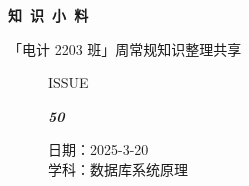 \documentclass[UTF8]{ctexart}
\newcommand\Black[1]{\textcolor[gray]{0.3}{#1}}
\newcommand\Brown[1]{\textcolor[HTML]{998A4E}{#1}}
\newcommand\IssueNumber{50}
\newcommand\Date{2025-3-20}
\newcommand\Subject{数据库系统原理}
\begin{document}
\BgThispage
\begin{center}
\phantom{...}

{\Large\textcolor{brown!40!white}{}}

\vspace{-2em}

{\Huge\bfseries\TitleFont \Black{知\ 识\ 小\ 料}}


\vspace{-0.1cm}
{\footnotesize \Brown{「电计 2203 班」周常规知识整理共享}}
\end{center}

\vspace{-0.5cm}


\begin{figure}[H]
\hspace{1cm}
\begin{minipage}[t]{0.3\textwidth}
\centering
    \Brown{\Genshin ISSUE}

    \vspace{-0.6cm}
    \Huge \Issue\slshape\bfseries\Black{\IssueNumber}
\end{minipage}
\hfill
\begin{minipage}[t]{0.35\textwidth}
\centering
    \Brown{日期：\Date} \\
\vspace{-0.1cm}
    \Brown{学科：\Subject} \\
\end{minipage}
\hspace{0.8cm}
\end{figure}
\end{document}

